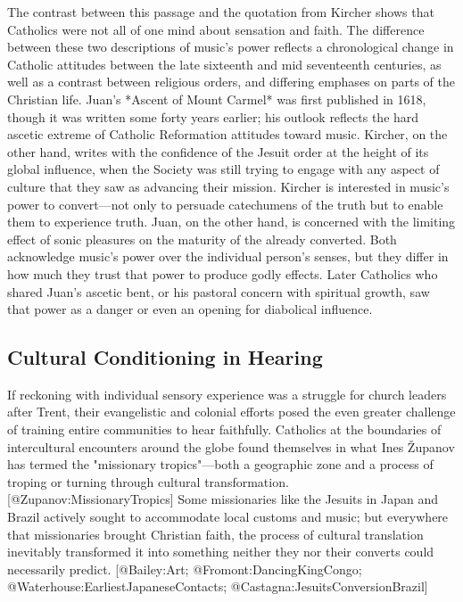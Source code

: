 The contrast between this passage and the quotation from Kircher shows that
Catholics were not all of one mind about sensation and faith.
The difference between these two descriptions of music's power reflects 
a chronological change in Catholic attitudes between the late sixteenth and
mid seventeenth centuries, as well as a contrast between religious orders, and
differing emphases on parts of the Christian life. 
Juan's *Ascent of Mount Carmel* was first published in 1618, though it was
written some forty years earlier; his outlook reflects the hard ascetic extreme
of Catholic Reformation attitudes toward music. 
Kircher, on the other hand, writes with the confidence of the Jesuit order at
the height of its global influence, when the Society was still trying to engage
with any aspect of culture that they saw as advancing their mission. 
Kircher is interested in music's power to convert---not only to persuade
catechumens of the truth but to enable them to experience truth. 
Juan, on the other hand, is concerned with the limiting effect of sonic
pleasures on the maturity of the already converted. 
Both acknowledge music's power over the individual person's senses, but they
differ in how much they trust that power to produce godly effects.
Later Catholics who shared Juan's ascetic bent, or his pastoral concern with
spiritual growth, saw that power as a danger or even an opening for diabolical
influence. 


\subsection{Cultural Conditioning in Hearing}


If reckoning with individual sensory experience was a struggle for church
leaders after Trent, their evangelistic and colonial efforts posed the even
greater challenge of training entire communities to hear faithfully.
Catholics at the boundaries of intercultural encounters around the globe found
themselves in what Ines Županov has termed the "missionary tropics"---both a
geographic zone and a process of troping or turning through cultural
transformation. 
[@Zupanov:MissionaryTropics]
Some missionaries like the Jesuits in Japan and Brazil actively sought to
accommodate local customs and music; but everywhere that missionaries brought
Christian faith, the process of cultural translation inevitably transformed it
into something neither they nor their converts could necessarily predict.
[@Bailey:Art; @Fromont:DancingKingCongo; @Waterhouse:EarliestJapaneseContacts;
@Castagna:JesuitsConversionBrazil]

